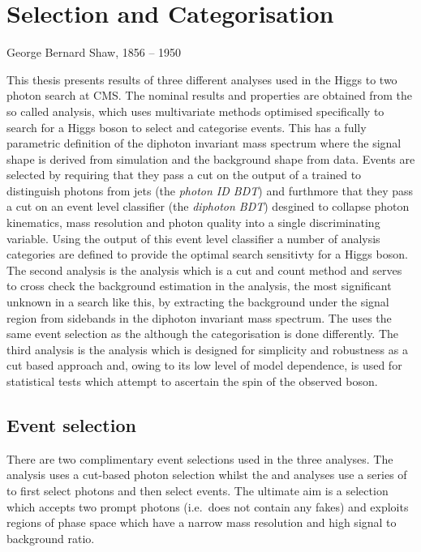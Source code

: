 \chapter{Selection and Categorisation}
\label{chap:selection_and_categorisation}
{George Bernard Shaw, 1856 -- 1950}

This thesis presents results of three different analyses used in the Higgs to two photon search at CMS. The nominal results and properties are obtained from the so called \MFM analysis, which uses multivariate methods optimised specifically to search for a \SM Higgs boson to select and categorise events. This has a fully parametric definition of the diphoton invariant mass spectrum where the signal shape is derived from \MC simulation and the background shape from data. Events are selected by requiring that they pass a cut on the output of a \BDT trained to distinguish photons from jets (the \textit{photon ID BDT}) and furthmore that they pass a cut on an event level classifier (the \textit{diphoton BDT}) desgined to collapse photon kinematics, mass resolution and photon quality into a single discriminating variable. Using the output of this event level classifier a number of analysis categories are defined to provide the optimal search sensitivty for a \SM Higgs boson. The second analysis is the \SMVA analysis which is a cut and count method and serves to cross check the background estimation in the \MFM analysis, the most significant unknown in a search like this, by extracting the background under the signal region from sidebands in the diphoton invariant mass spectrum. The \SMVA uses the same event selection as the \MFM although the categorisation is done differently. The third analysis is the \CiC analysis which is designed for simplicity and robustness as a cut based approach and, owing to its low level of model dependence, is used for statistical tests which attempt to ascertain the spin of the observed boson.

\section{Event selection}
\label{sec:event_selection}

There are two complimentary event selections used in the three analyses. The \CiC analysis uses a cut-based photon selection whilst the \MFM and \SMVA analyses use a series of \BDTs to first select photons and then select events. The ultimate aim is a selection which accepts two prompt photons (i.e.\ does not contain any fakes) and exploits regions of phase space which have a narrow mass resolution and high signal to background ratio.

